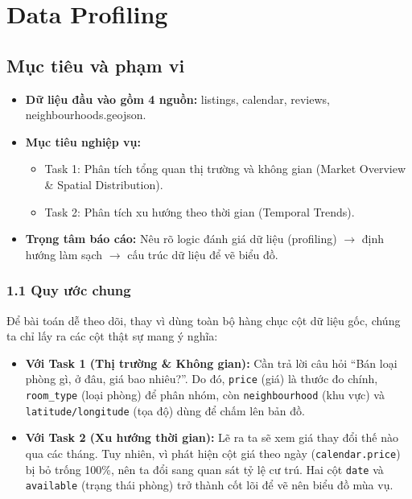 ﻿\section{Data Profiling}

\subsection{Mục tiêu và phạm vi}

\begin{itemize}
    \item \textbf{Dữ liệu đầu vào gồm 4 nguồn:} listings, calendar, reviews, neighbourhoods.geojson.
    \item \textbf{Mục tiêu nghiệp vụ:}
    \begin{itemize}
        \item Task 1: Phân tích tổng quan thị trường và không gian (Market Overview \& Spatial Distribution).
        \item Task 2: Phân tích xu hướng theo thời gian (Temporal Trends).
    \end{itemize}
    \item \textbf{Trọng tâm báo cáo:} Nêu rõ logic đánh giá dữ liệu (profiling) $\rightarrow$ định hướng làm sạch $\rightarrow$ cấu trúc dữ liệu để vẽ biểu đồ.
\end{itemize}

\subsubsection*{1.1 Quy ước chung}

Để bài toán dễ theo dõi, thay vì dùng toàn bộ hàng chục cột dữ liệu gốc, chúng ta chỉ lấy ra các cột thật sự mang ý nghĩa:

\begin{itemize}
    \item \textbf{Với Task 1 (Thị trường \& Không gian):} Cần trả lời câu hỏi ``Bán loại phòng gì, ở đâu, giá bao nhiêu?''. Do đó, \texttt{price} (giá) là thước đo chính, \texttt{room\_type} (loại phòng) để phân nhóm, còn \texttt{neighbourhood} (khu vực) và \texttt{latitude/longitude} (tọa độ) dùng để chấm lên bản đồ.
    \item \textbf{Với Task 2 (Xu hướng thời gian):} Lẽ ra ta sẽ xem giá thay đổi thế nào qua các tháng. Tuy nhiên, vì phát hiện cột giá theo ngày (\texttt{calendar.price}) bị bỏ trống 100\%, nên ta đổi sang quan sát tỷ lệ cư trú. Hai cột \texttt{date} và \texttt{available} (trạng thái phòng) trở thành cốt lõi để vẽ nên biểu đồ mùa vụ.
\end{itemize}

